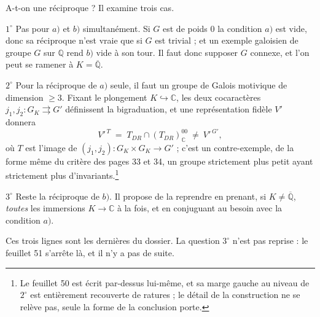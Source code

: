 \documentclass[11pt,a4paper]{article}
\begin{document}
A-t-on une réciproque ? Il examine trois cas.

$1^{\circ}$ Pas pour $a)$ et $b)$ simultanément. Si $G$ est de poids $0$ la
condition $a)$ est vide, donc sa réciproque n'est vraie que si $G$ est trivial ;
et un exemple galoisien de groupe $G$ sur $\mathbb{Q}$ rend $b)$ vide à son tour.
Il faut donc supposer $G$ connexe, et l'on peut se ramener à
$K = \overline{\mathbb{Q}}$.

$2^{\circ}$ Pour la réciproque de $a)$ seule, il faut un groupe de Galois
motivique de dimension $\geqslant 3$. Fixant le plongement
$K \hookrightarrow \mathbb{C}$, les deux cocaractères $j_{1}, j_{2} : G_{K}
\rightrightarrows G'$ définissent la bigraduation, et une représentation fidèle
$V'$ donnera
\[
{V'}^{\,T} \;=\; T_{DR} \cap (T_{DR})^{00}_{\mathbb{C}} \ \neq\ {V'}^{\,G'} ,
\]
où $T$ est l'image de $(j_{1}, j_{2}) : G_{K} \times G_{K} \to G'$ ; c'est
un contre-exemple, de la forme même du critère des pages 33 et 34, un groupe
strictement plus petit ayant strictement plus d'invariants.\footnote{Le feuillet
50 est écrit par-dessus lui-même, et sa marge gauche au niveau de $2^{\circ}$ est
entièrement recouverte de ratures ; le détail de la construction ne se relève
pas, seule la forme de la conclusion porte.}

$3^{\circ}$ Reste la réciproque de $b)$. Il propose de la reprendre en prenant,
si $K \neq \overline{\mathbb{Q}}$, \emph{toutes} les immersions
$K \to \mathbb{C}$ à la fois, et en conjuguant au besoin avec la condition $a)$.

Ces trois lignes sont les dernières du dossier. La question $3^{\circ}$ n'est
pas reprise : le feuillet 51 s'arrête là, et il n'y a pas de suite.
\end{document}
